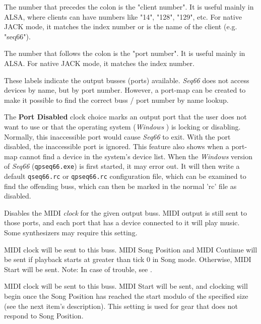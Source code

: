    The number that precedes the colon is the "client number".
   It is useful mainly in ALSA, where clients can have numbers like "14",
   "128", "129", etc.  For native JACK mode, it matches the index number or is
   the name of the client (e.g. "seq66").

   The number that follows the colon is the "port number".
   It is useful mainly in ALSA.
   For native JACK mode, it matches the index number.

   These labels indicate the output busses (ports) available.
   \textsl{Seq66} does not access devices by name, but by port number.
   However, a port-map can be created to make it possible to find the correct
   buss / port number by name lookup.

   The \textbf{Port Disabled} clock choice marks an output port
   that the user does not want to use or that the operating system
   (\textsl{Windows} \smiley)
   is locking or disabling.
   Normally, this inaccessible port would cause \textsl{Seq66} to exit.
   With the port disabled, the inaccessible port is ignored.
   This feature also shows when a port-map cannot find a device in the system's
   device list.
   When the \textsl{Windows} version of \textsl{Seq66}
   (\texttt{qpseq66.exe}) is first started, it may error out.
   It will then write a default \texttt{qseq66.rc}
   or \texttt{qpseq66.rc} configuration file,
   which can be examined to find the offending buss, which can then be
   marked in the normal 'rc' file as disabled.

   Disables the MIDI \textsl{clock} for the given output buss.
   MIDI output is still sent to those ports, and
   each port that has a device connected to it will play music.
   Some synthesizers may require this setting.

   MIDI clock will be sent to this buss.
   MIDI Song Position and MIDI Continue will be sent if playback starts
   at greater than tick 0 in Song mode.  Otherwise, MIDI Start will be sent.
   Note: In case of trouble, see
   .

   MIDI clock will be sent to this buss.
   MIDI Start will be sent, and clocking will begin
   once the Song Position has reached the start modulo of the specified size
   (see the next item's description).
   This setting is used for gear that does not respond to Song Position.

